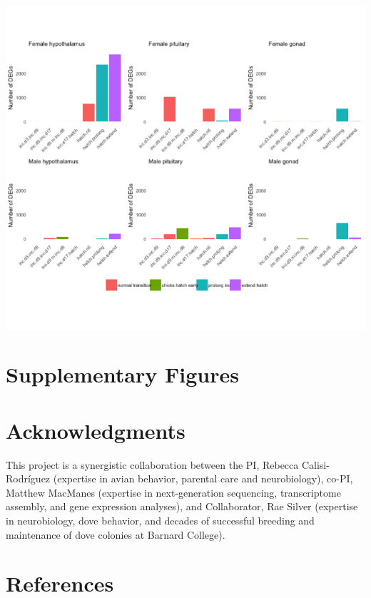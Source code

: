 \documentclass[10pt,letterpaper]{article}
\begin{document}
\includegraphics{manipulation_manuscript_files/figure-latex/unnamed-chunk-4-1.pdf}

\hypertarget{supplementary-figures}{%
\section{Supplementary Figures}\label{supplementary-figures}}

\hypertarget{acknowledgments}{%
\section{Acknowledgments}\label{acknowledgments}}

This project is a synergistic collaboration between the PI, Rebecca
Calisi-Rodríguez (expertise in avian behavior, parental care and
neurobiology), co-PI, Matthew MacManes (expertise in next-generation
sequencing, transcriptome assembly, and gene expression analyses), and
Collaborator, Rae Silver (expertise in neurobiology, dove behavior, and
decades of successful breeding and maintenance of dove colonies at
Barnard College).

\hypertarget{references}{%
\section*{References}\label{references}}

\nolinenumbers
\end{document}
